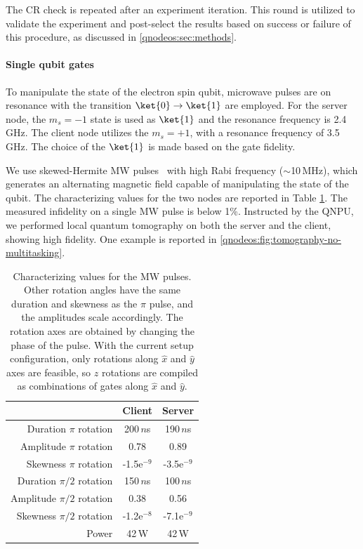 The \ac{CR} check is repeated after an experiment iteration. This round is utilized to validate the experiment and post-select the results based on success or failure of this procedure, as discussed in \cref{qnodeos:sec:methods}.

\paragraph{Single qubit gates}

To manipulate the state of the electron spin qubit, microwave pulses are on resonance with the transition $\ket{0}\rightarrow\ket{1}$ are employed. For the server node, the $m_s=-1$ state is used as $\ket{1}$ and the resonance frequency is 2.4\,GHz. The client node utilizes the $m_s=+1$, with a resonance frequency of 3.5\,GHz. The choice of the $\ket{1}$ is made based on the gate fidelity.

We use skewed-Hermite \acf{MW} pulses~\cite{warren_1984,vandersypen_2005} with high Rabi frequency ($\sim$10\,MHz), which generates an alternating magnetic field capable of manipulating the state of the qubit. The characterizing values for the two nodes are reported in Table \ref{tab:mw_pulse}. The measured infidelity on a single \ac{MW} pulse is below 1\%. Instructed by the \ac{QNPU}, we performed local quantum tomography on both the server and the client, showing high fidelity. One example is reported in \cref{qnodeos:fig:tomography-no-multitasking}.

\begin{table}[]
    \centering
    \begin{tabular}{|r|c|c|}
    \hline
 &Client & Server\\
\hline
        Duration $\pi$ rotation & 200\,$n$s & 190\,$n$s\\
        Amplitude $\pi$ rotation & 0.78 & 0.89\\
        Skewness $\pi$ rotation & -1.5e$^{-9}$ & -3.5e$^{-9}$\\
        Duration $\pi/2$ rotation & 150\,$n$s&  100\,$n$s\\
        Amplitude $\pi/2$ rotation & 0.38 & 0.56\\
        Skewness $\pi/2$ rotation & -1.2e$^{-8}$& -7.1e$^{-9}$ \\
        Power & 42\,W & 42\,W\\
        \hline
    \end{tabular}
    \caption{Characterizing values for the \ac{MW} pulses. Other rotation angles have the same duration and skewness as the $\pi$ pulse, and the amplitudes scale accordingly. The rotation axes are obtained by changing the phase of the pulse. With the current setup configuration, only rotations along $\hat{x}$ and $\hat{y}$ axes are feasible, so $\hat{z}$ rotations are compiled as combinations of gates along $\hat{x}$ and $\hat{y}$.}
    \label{tab:mw_pulse}
\end{table}

